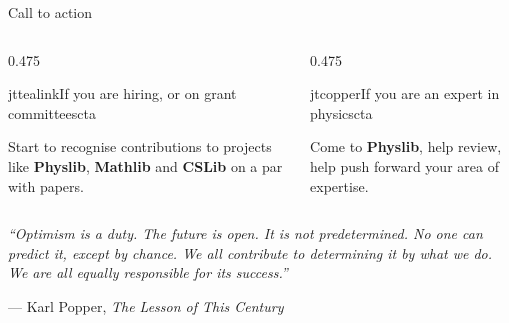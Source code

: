 \documentclass[aspectratio=169,10pt]{beamer}
\newcommand{\jtbody}{\small}
\newcommand{\jtmeta}{\footnotesize}
\begin{document}
\begin{frame}{Call to action}
  \vfill
  \begin{columns}[T,onlytextwidth]

    \begin{column}{0.475\textwidth}
      \begin{jtblockh}{jttealink}{If you are hiring, or on grant committees}{cta}
        {\jtbody\color{jtslate}Start to recognise contributions to projects
         like \textbf{Physlib}, \textbf{Mathlib} and \textbf{CSLib} on a
         par with papers.\par}
      \end{jtblockh}
    \end{column}

    \begin{column}{0.475\textwidth}
      \begin{jtblockh}{jtcopper}{If you are an expert in physics}{cta}
        {\jtbody\color{jtslate}Come to \textbf{Physlib}, help review, help
         push forward your area of expertise.\par}
      \end{jtblockh}
    \end{column}

  \end{columns}

  \vspace{16pt}
  {\fontsize{13}{18}\selectfont\itshape\color{jtslate}%
    ``Optimism is a duty. The future is open. It is not predetermined. No one
    can predict it, except by chance. We all contribute to determining it by
    what we do. We are all equally responsible for its success.''\par}
  \vspace{2pt}
  {\jtmeta\color{jtgrey}--- Karl Popper, \emph{The Lesson of This Century}\par}
  \vfill
\end{frame}
\end{document}
